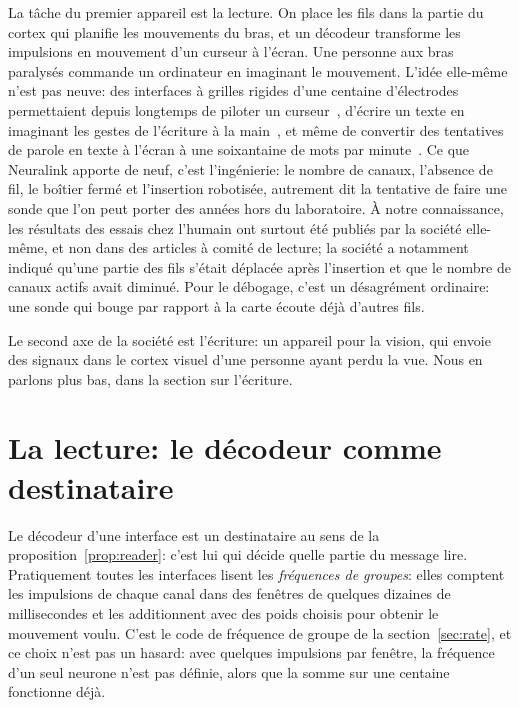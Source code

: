 La tâche du premier appareil est la lecture. On place les fils dans la partie du cortex qui planifie les mouvements du bras, et un décodeur transforme les impulsions en mouvement d'un curseur à l'écran. Une personne aux bras paralysés commande un ordinateur en imaginant le mouvement. L'idée elle-même n'est pas neuve: des interfaces à grilles rigides d'une centaine d'électrodes permettaient depuis longtemps de piloter un curseur~\cite{Hochberg2006}, d'écrire un texte en imaginant les gestes de l'écriture à la main~\cite{Willett2021}, et même de convertir des tentatives de parole en texte à l'écran à une soixantaine de mots par minute~\cite{Willett2023}. Ce que Neuralink apporte de neuf, c'est l'ingénierie: le nombre de canaux, l'absence de fil, le boîtier fermé et l'insertion robotisée, autrement dit la tentative de faire une sonde que l'on peut porter des années hors du laboratoire. À notre connaissance, les résultats des essais chez l'humain ont surtout été publiés par la société elle-même, et non dans des articles à comité de lecture; la société a notamment indiqué qu'une partie des fils s'était déplacée après l'insertion et que le nombre de canaux actifs avait diminué. Pour le débogage, c'est un désagrément ordinaire: une sonde qui bouge par rapport à la carte écoute déjà d'autres fils.

Le second axe de la société est l'écriture: un appareil pour la vision, qui envoie des signaux dans le cortex visuel d'une personne ayant perdu la vue. Nous en parlons plus bas, dans la section sur l'écriture.

\section{La lecture: le décodeur comme destinataire}

Le décodeur d'une interface est un destinataire au sens de la proposition~\ref{prop:reader}: c'est lui qui décide quelle partie du message lire. Pratiquement toutes les interfaces lisent les \emph{fréquences de groupes}: elles comptent les impulsions de chaque canal dans des fenêtres de quelques dizaines de millisecondes et les additionnent avec des poids choisis pour obtenir le mouvement voulu. C'est le code de fréquence de groupe de la section~\ref{sec:rate}, et ce choix n'est pas un hasard: avec quelques impulsions par fenêtre, la fréquence d'un seul neurone n'est pas définie, alors que la somme sur une centaine fonctionne déjà.

